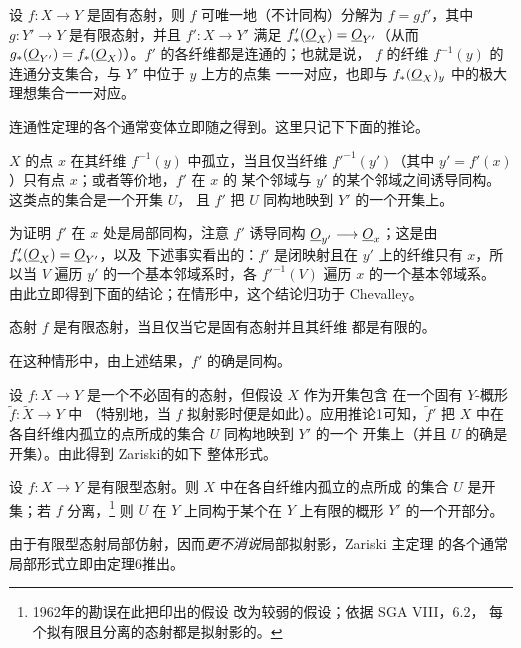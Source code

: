  设
$f:X\longrightarrow Y$ 是固有态射，则 $f$ 可唯一地（不计同构）分解为
$f=gf'$，其中 $g:Y'\longrightarrow Y$ 是有限态射，并且
$f':X\longrightarrow Y'$ 满足 $f'_*(\underline{O}_X)=\underline{O}_{Y'}$（从而
$g_*(\underline{O}_{Y'})=f_*(\underline{O}_X)$）。$f'$ 的各纤维都是连通的；也就是说，
$f$ 的纤维 $f^{-1}(y)$ 的连通分支集合，与 $Y'$ 中位于 $y$ 上方的点集
一一对应，也即与 $f_*(\underline{O}_X)_y$ 中的极大理想集合一一对应。

连通性定理的各个通常变体立即随之得到。这里只记下下面的推论。

 $X$ 的点 $x$ 在其纤维 $f^{-1}(y)$ 中孤立，当且仅当纤维
$f'^{-1}(y')$（其中 $y'=f'(x)$）只有点 $x$；或者等价地，$f'$ 在 $x$ 的
某个邻域与 $y'$ 的某个邻域之间诱导同构。这类点的集合是一个开集 $U$，
且 $f'$ 把 $U$ 同构地映到 $Y'$ 的一个开集上。

为证明 $f'$ 在 $x$ 处是局部同构，注意 $f'$ 诱导同构
$\underline{O}_{y'}\longrightarrow\underline{O}_x$；这是由 $f'_*(\underline{O}_X)=\underline{O}_{Y'}$，以及
下述事实看出的：$f'$ 是闭映射且在 $y'$ 上的纤维只有 $x$，所以当 $V$
遍历 $y'$ 的一个基本邻域系时，各 $f'^{-1}(V)$ 遍历 $x$ 的一个基本邻域系。
由此立即得到下面的结论；在情形中，这个结论归功于 Chevalley。

 态射 $f$ 是有限态射，当且仅当它是固有态射并且其纤维
都是有限的。

在这种情形中，由上述结果，$f'$ 的确是同构。

设 $f:X\longrightarrow Y$ 是一个不必固有的态射，但假设 $X$ 作为开集包含
在一个固有 $Y$-概形 $\widetilde f:\widetilde X\longrightarrow Y$ 中
（特别地，当 $f$ 拟射影时便是如此）。应用推论1可知，$\widetilde f'$
把 $X$ 中在各自纤维内孤立的点所成的集合 $U$ 同构地映到 $Y'$ 的一个
开集上（并且 $U$ 的确是开集）。由此得到 Zariski的如下
整体形式。

 设
$f:X\longrightarrow Y$ 是有限型态射。则 $X$ 中在各自纤维内孤立的点所成
的集合 $U$ 是开集；若 $f$ 分离，\footnote{1962年的勘误在此把印出的假设
改为较弱的假设；依据 SGA VIII，6.2，
每个拟有限且分离的态射都是拟射影的。} 则 $U$ 在 $Y$ 上同构于某个在
$Y$ 上有限的概形 $Y'$ 的一个开部分。

由于有限型态射局部仿射，因而\textit{更不消说}局部拟射影，Zariski 主定理
的各个通常局部形式立即由定理6推出。


